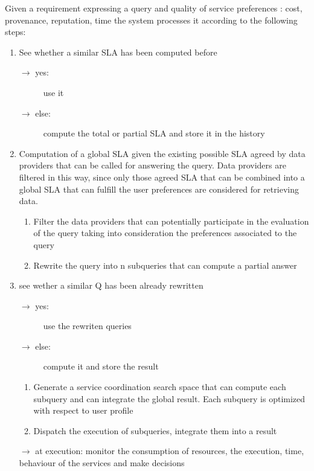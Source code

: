 Given a requirement expressing a query and quality of service preferences : cost, provenance, reputation, time the system processes it according to the following steps:

\begin{enumerate}

\item See whether a similar SLA has been computed before
  \begin{description}
  \item[$\longrightarrow$ yes:] use it
  \item[$\longrightarrow$ else:] compute the total or partial SLA and store it in the history
  \end{description}
  
\item Computation of a global SLA given the existing possible SLA agreed by data providers that can be called for answering the query. Data providers are filtered in this way, since only those agreed SLA that can be combined into a global SLA that can fulfill the user preferences are considered for retrieving data.

  \begin{enumerate}
  \item Filter the data providers that can potentially participate in the evaluation of the query taking into consideration the preferences associated to the query
  \item Rewrite the query into n subqueries that can compute a partial answer
  \end{enumerate}

\item see wether a similar Q has been already rewritten
  \begin{description}
  \item[$\longrightarrow$ yes:] use the rewriten queries
  \item[$\longrightarrow$ else:] compute it and store the result
  \end{description}
  \begin{enumerate}
  \item Generate a service coordination search space that can compute each subquery and can integrate the global result. 
Each subquery is optimized with respect to user profile
  \item Dispatch the execution of subqueries, integrate them into a result
  \end{enumerate}

\item[$\longrightarrow$] at execution: monitor the consumption of resources, the execution, time, behaviour of the services and make decisions
\end{enumerate}